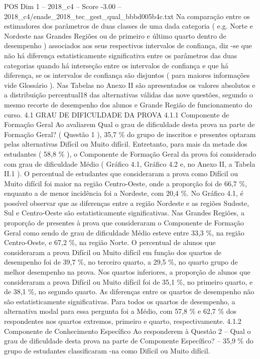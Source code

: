 \begin{textsample}{POS Dim 1 – 2018\_c4 – Score -3.00 – 2018\_c4/enade\_2018\_tec\_gest\_qual\_bbbd005b4c.txt}
Na comparação entre os estimadores dos parâmetros de duas classes de uma dada categoria ( e.g.
Norte e Nordeste nas Grandes Regiões ou de primeiro e último quarto dentro de desempenho ) associados aos seus respectivos intervalos de confiança, diz -se que não há diferença estatisticamente significativa entre os parâmetros das duas categorias quando há interseção entre os intervalos de confiança e que há diferença, se os intervalos de confiança são disjuntos ( para maiores informações vide Glossário ).
Nas Tabelas no Anexo II são apresentados os valores absolutos e a distribuição percentual18 das alternativas válidas das nove questões, segundo o mesmo recorte de desempenho dos alunos e Grande Região de funcionamento do curso. 4.1 GRAU DE DIFICULDADE DA PROVA 4.1.1 Componente de Formação Geral Ao avaliarem Qual o grau de dificuldade desta prova na parte de Formação Geral? ( Questão 1 ), 35,7 \% do grupo de inscritos e presentes optaram pelas alternativas Difícil ou Muito difícil.
Entretanto, para mais da metade dos estudantes ( 58,8 \% ), o Componente de Formação Geral da prova foi considerado com grau de dificuldade Médio ( Gráfico 4.1, Gráfico 4.2 e, no Anexo II, a Tabela II.1 ).
O percentual de estudantes que consideraram a prova como Difícil ou Muito difícil foi maior na região Centro-Oeste, onde a proporção foi de 66,7 \%, enquanto a de menor incidência foi a Nordeste, com 20,4 \%.
No Gráfico 4.1, é possível observar que as diferenças entre a região Nordeste e as regiões Sudeste, Sul e Centro-Oeste são estatisticamente significativas.
Nas Grandes Regiões, a proporção de presentes à prova que consideraram o Componente de Formação Geral como sendo de grau de dificuldade Médio esteve entre 33,3 \%, na região Centro-Oeste, e 67,2 \%, na região Norte.
O percentual de alunos que consideraram a prova Difícil ou Muito difícil em função dos quartos de desempenho foi de 39,7 \%, no terceiro quarto, a 29,5 \%, no quarto grupo de melhor desempenho na prova.
Nos quartos inferiores, a proporção de alunos que consideraram a prova Difícil ou Muito difícil foi de 35,1 \%, no primeiro quarto, e de 38,1 \%, no segundo quarto.
As diferenças entre os quartos de desempenho não são estatisticamente significativas.
Para todos os quartos de desempenho, a alternativa modal para essa pergunta foi a Médio, com 57,8 \% e 62,7 \% dos respondentes nos quartos extremos, primeiro e quarto, respectivamente. 4.1.2 Componente de Conhecimento Específico Ao responderem à Questão 2 – Qual o grau de dificuldade desta prova na parte de Componente Específico? – 35,9 \% do grupo de estudantes classificaram -na como Difícil ou Muito difícil.

\end{textsample}
